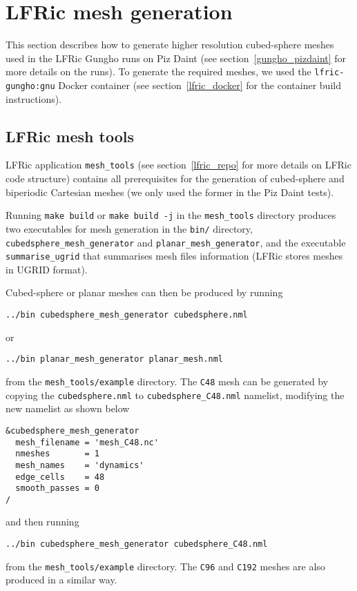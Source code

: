 \documentclass[twoside,a4paper,12pt]{article}
\begin{document}
\section{LFRic mesh generation}\label{mesh_generation}

This section describes how to generate higher resolution cubed-sphere meshes
used in the LFRic Gungho runs on Piz Daint (see section~\ref{gungho_pizdaint}
for more details on the runs). To generate the required meshes, we used the
\texttt{lfric-gungho:gnu} Docker container (see section~\ref{lfric_docker}
for the container build instructions).
%
%
\subsection{LFRic mesh tools}\label{lfric_mesh_tools}

LFRic application \texttt{mesh\_tools} (see section~\ref{lfric_repo} for more
details on LFRic code structure) contains all prerequisites for the generation
of cubed-sphere and biperiodic Cartesian meshes (we only used the former in the
Piz Daint tests).

Running \texttt{make build} or \texttt{make build -j} in the \texttt{mesh\_tools}
directory produces two executables for mesh generation in the \texttt{bin/}
directory, \texttt{cubedsphere\_mesh\_generator} and
\texttt{planar\_mesh\_generator}, and the executable \texttt{summarise\_ugrid}
that summarises mesh files information (LFRic stores meshes in UGRID format).

Cubed-sphere or planar meshes can then be produced by running
\begin{Verbatim}[fontsize=\small]
../bin cubedsphere_mesh_generator cubedsphere.nml
\end{Verbatim}
or
\begin{Verbatim}[fontsize=\small]
../bin planar_mesh_generator planar_mesh.nml
\end{Verbatim}
from the \texttt{mesh\_tools/example} directory. The \texttt{C48} mesh can be
generated by copying the \texttt{cubedsphere.nml} to
\texttt{cubedsphere\_C48.nml} namelist, modifying the new namelist as shown below
\begin{Verbatim}[fontsize=\small]
&cubedsphere_mesh_generator
  mesh_filename = 'mesh_C48.nc'
  nmeshes       = 1
  mesh_names    = 'dynamics'
  edge_cells    = 48
  smooth_passes = 0
/
\end{Verbatim}
and then running
\begin{Verbatim}[fontsize=\small]
../bin cubedsphere_mesh_generator cubedsphere_C48.nml
\end{Verbatim}
from the \texttt{mesh\_tools/example} directory. The \texttt{C96} and
\texttt{C192} meshes are also produced in a similar way.
%
%
\end{document}
